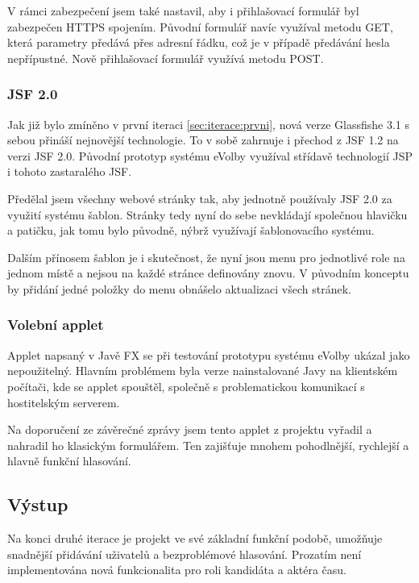 \documentclass[11pt,twoside,a4paper]{book}
\begin{document}
V rámci zabezpečení jsem také nastavil, aby i přihlašovací formulář byl zabezpečen HTTPS spojením. Původní formulář navíc využíval metodu GET, která parametry předává přes adresní řádku, což je v případě předávání hesla nepřípustné. Nově přihlašovací formulář využívá metodu POST.

\subsubsection{JSF 2.0}

Jak již bylo zmíněno v první iteraci \ref{sec:iterace:prvni}, nová verze Glassfishe 3.1 s sebou přináší nejnovější technologie. To v sobě zahrnuje i přechod z JSF 1.2 na verzi JSF 2.0. Původní prototyp systému eVolby\cite{www:prototyp} využíval střídavě technologií JSP i tohoto zastaralého JSF.

Předělal jsem všechny webové stránky tak, aby jednotně používaly JSF 2.0 za využití systému šablon. Stránky tedy nyní do sebe nevkládají společnou hlavičku a patičku, jak tomu bylo původně, nýbrž využívají šablonovacího systému. 

Dalším přínosem šablon je i skutečnost, že nyní jsou menu pro jednotlivé role na jednom místě a nejsou na každé stránce definovány znovu. V původním konceptu by přidání jedné položky do menu obnášelo aktualizaci všech stránek. 

\subsubsection{Volební applet}

Applet napsaný v Javě FX se při testování prototypu systému eVolby\cite{www:prototyp} ukázal jako nepoužitelný. Hlavním problémem byla verze nainstalované Javy na klientském počítači, kde se applet spouštěl, společně s problematickou komunikací s hostitelským serverem.

Na doporučení ze závěrečné zprávy jsem tento applet z projektu vyřadil a nahradil ho klasickým formulářem. Ten zajišťuje mnohem pohodlnější, rychlejší a hlavně funkční hlasování.

\subsection{Výstup}

Na konci druhé iterace je projekt ve své základní funkční podobě, umožňuje snadnější přidávání uživatelů a bezproblémové hlasování. Prozatím není implementována nová funkcionalita pro roli kandidáta a aktéra času.
\end{document}

